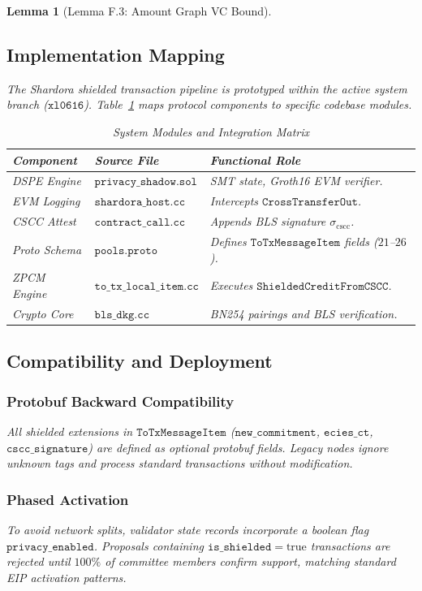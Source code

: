 \documentclass[journal,10pt,twocolumn]{IEEEtran}
\newtheorem{lemma}[theorem]{Lemma}
\theoremstyle{definition}
\theoremstyle{remark}
\begin{document}
\begin{lemma}[Lemma F.3: Amount Graph VC Bound]
\subsection{Implementation Mapping}
The Shardora shielded transaction pipeline is prototyped within the active system branch ($\mathtt{xl0616}$). Table~\ref{tab:code_mapping} maps protocol components to specific codebase modules.

\begin{table}[h]
\centering
\caption{System Modules and Integration Matrix}
\label{tab:code_mapping}
\small
\begin{tabularx}{\columnwidth}{llX}
\toprule
\textbf{Component} & \textbf{Source File} & \textbf{Functional Role} \\
\midrule
DSPE Engine & $\mathtt{privacy\_shadow.sol}$ & SMT state, Groth16 EVM verifier. \\
EVM Logging & $\mathtt{shardora\_host.cc}$ & Intercepts $\mathtt{CrossTransferOut}$. \\
CSCC Attest & $\mathtt{contract\_call.cc}$ & Appends BLS signature $\sigma_{\text{cscc}}$. \\
Proto Schema & $\mathtt{pools.proto}$ & Defines $\mathtt{ToTxMessageItem}$ fields ($21$--$26$). \\
ZPCM Engine & $\mathtt{to\_tx\_local\_item.cc}$ & Executes $\mathtt{ShieldedCreditFromCSCC}$. \\
Crypto Core & $\mathtt{bls\_dkg.cc}$ & BN254 pairings and BLS verification. \\
\bottomrule
\end{tabularx}
\end{table}

\subsection{Compatibility and Deployment}
\subsubsection{Protobuf Backward Compatibility}
All shielded extensions in $\mathtt{ToTxMessageItem}$ ($\mathtt{new\_commitment}$, $\mathtt{ecies\_ct}$, $\mathtt{cscc\_signature}$) are defined as optional protobuf fields. Legacy nodes ignore unknown tags and process standard transactions without modification.

\subsubsection{Phased Activation}
To avoid network splits, validator state records incorporate a boolean flag $\mathtt{privacy\_enabled}$. Proposals containing $\mathtt{is\_shielded} = \text{true}$ transactions are rejected until $100\%$ of committee members confirm support, matching standard EIP activation patterns.


\end{lemma}
\end{document}
